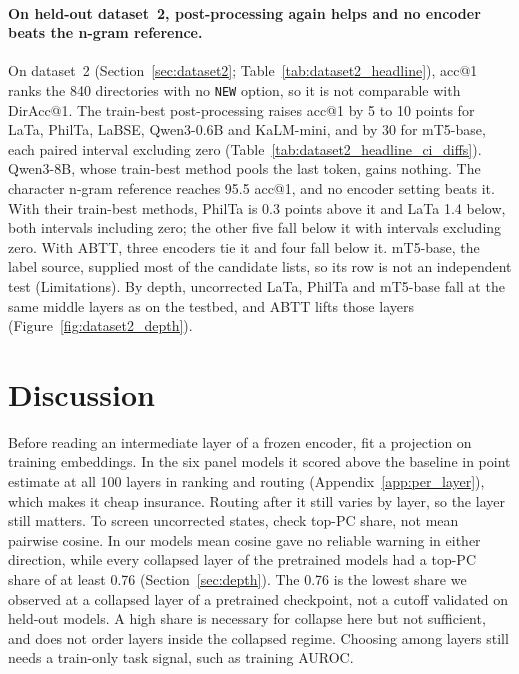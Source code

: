 \documentclass[11pt]{article}
\begin{document}
\paragraph{On held-out dataset~2, post-processing again helps and no encoder beats the n-gram reference.}
On dataset~2 (Section~\ref{sec:dataset2}; Table~\ref{tab:dataset2_headline}), acc@1 ranks the 840 directories with no \texttt{NEW} option, so it is not comparable with DirAcc@1.
The train-best post-processing raises acc@1 by 5 to 10 points for LaTa, PhilTa, LaBSE, Qwen3-0.6B and KaLM-mini, and by 30 for mT5-base, each paired interval excluding zero (Table~\ref{tab:dataset2_headline_ci_diffs}).
Qwen3-8B, whose train-best method pools the last token, gains nothing.
The character n-gram reference reaches 95.5 acc@1, and no encoder setting beats it.
With their train-best methods, PhilTa is 0.3 points above it and LaTa 1.4 below, both intervals including zero; the other five fall below it with intervals excluding zero.
With ABTT, three encoders tie it and four fall below it.
mT5-base, the label source, supplied most of the candidate lists, so its row is not an independent test (Limitations).
By depth, uncorrected LaTa, PhilTa and mT5-base fall at the same middle layers as on the testbed, and ABTT lifts those layers (Figure~\ref{fig:dataset2_depth}).

\section{Discussion}
\label{sec:discussion}

Before reading an intermediate layer of a frozen encoder, fit a projection on training embeddings.
In the six panel models it scored above the baseline in point estimate at all 100 layers in ranking and routing (Appendix~\ref{app:per_layer}), which makes it cheap insurance.
Routing after it still varies by layer, so the layer still matters.
To screen uncorrected states, check top-PC share, not mean pairwise cosine.
In our models mean cosine gave no reliable warning in either direction, while every collapsed layer of the pretrained models had a top-PC share of at least 0.76 (Section~\ref{sec:depth}).
The 0.76 is the lowest share we observed at a collapsed layer of a pretrained checkpoint, not a cutoff validated on held-out models.
A high share is necessary for collapse here but not sufficient, and does not order layers inside the collapsed regime.
Choosing among layers still needs a train-only task signal, such as training AUROC.
\end{document}
